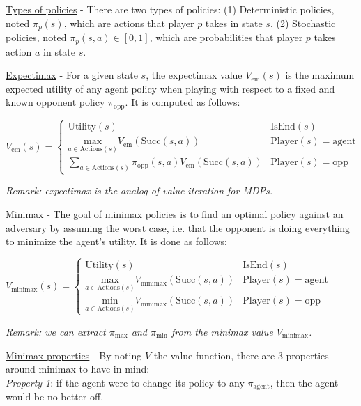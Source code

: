 \documentclass[4pt,landscape]{article}
\begin{document}
\begin{multicols*}{4}
{\underline{Types of policies} - There are two types of policies:
(1) Deterministic policies, noted $\pi_p(s)$, which are actions that player $p$ takes in state $s$.
(2) Stochastic policies, noted $\pi_p(s,a)\in[0,1]$, which are probabilities that player $p$ takes action $a$ in state $s$.}\par

\columnbreak
{\underline{Expectimax} - For a given state $s$, the expectimax value $V_{\textrm{em}}(s)$ is the maximum expected utility of any agent policy when playing with respect to a fixed and known opponent policy $\pi_{\textrm{opp}}$. It is computed as follows:}\par

${V_{\textrm{em}}(s)=\left\{\begin{array}{ll}\textrm{Utility}(s) & \textrm{IsEnd}(s)\\\underset{a\in\textrm{Actions}(s)}{\textrm{max}}V_{\textrm{em}}(\textrm{Succ}(s,a)) & \textrm{Player}(s)=\textrm{agent}\\\displaystyle\sum_{a\in\textrm{Actions}(s)}\pi_{\textrm{opp}}(s,a)V_{\textrm{em}}(\textrm{Succ}(s,a)) & \textrm{Player}(s)=\textrm{opp}\end{array}\right.}$

{\textit{Remark: expectimax is the analog of value iteration for MDPs.}}\par


{\underline{Minimax} - The goal of minimax policies is to find an optimal policy against an adversary by assuming the worst case, i.e. that the opponent is doing everything to minimize the agent's utility. It is done as follows:}\par

${V_{\textrm{minimax}}(s)=\left\{\begin{array}{ll}\textrm{Utility}(s) & \textrm{IsEnd}(s)\\\underset{a\in\textrm{Actions}(s)}{\textrm{max}}V_{\textrm{minimax}}(\textrm{Succ}(s,a)) & \textrm{Player}(s)=\textrm{agent}\\\underset{a\in\textrm{Actions}(s)}{\textrm{min}}V_{\textrm{minimax}}(\textrm{Succ}(s,a)) & \textrm{Player}(s)=\textrm{opp}\end{array}\right.}$

{\textit{Remark: we can extract $\pi_{\textrm{max}}$ and $\pi_{\textrm{min}}$ from the minimax value $V_{\textrm{minimax}}$.}}\par


{\underline{Minimax properties} - By noting $V$ the value function, there are 3 properties around minimax to have in mind:\\
\textit{Property 1}: if the agent were to change its policy to any $\pi_{\textrm{agent}}$, then the agent would be no better off.

}
\end{multicols*}
\end{document}

